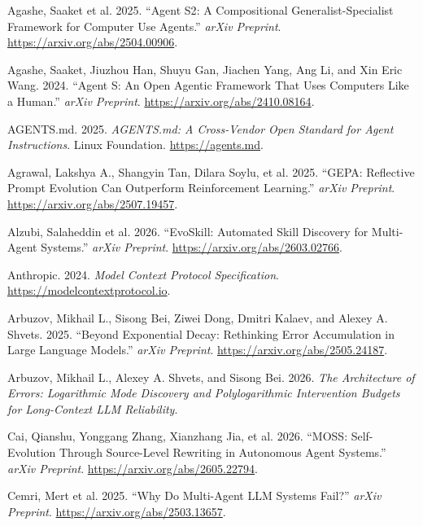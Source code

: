 \documentclass[
]{article}
\newlength{\cslhangindent}
\newenvironment{CSLReferences}[2] %
 {\begin{list}{}{%
  \setlength{\itemindent}{0pt}
  \setlength{\leftmargin}{0pt}
  \setlength{\parsep}{0pt}
  \ifodd #1
   \setlength{\leftmargin}{\cslhangindent}
   \setlength{\itemindent}{-1\cslhangindent}
  \fi
  \setlength{\itemsep}{#2\baselineskip}}}
 {\end{list}}
\begin{document}
\protect{}\label{refs}
\begin{CSLReferences}{1}{1}
{Agashe, Saaket et al.} 2025. {``{Agent S2}: A Compositional
Generalist-Specialist Framework for Computer Use Agents.''} \emph{arXiv
Preprint}. \url{https://arxiv.org/abs/2504.00906}.

Agashe, Saaket, Jiuzhou Han, Shuyu Gan, Jiachen Yang, Ang Li, and Xin
Eric Wang. 2024. {``{Agent S}: An Open Agentic Framework That Uses
Computers Like a Human.''} \emph{arXiv Preprint}.
\url{https://arxiv.org/abs/2410.08164}.

AGENTS.md. 2025. \emph{{AGENTS.md}: A Cross-Vendor Open Standard for
Agent Instructions}. Linux Foundation. \url{https://agents.md}.

Agrawal, Lakshya A., Shangyin Tan, Dilara Soylu, et al. 2025. {``{GEPA}:
Reflective Prompt Evolution Can Outperform Reinforcement Learning.''}
\emph{arXiv Preprint}. \url{https://arxiv.org/abs/2507.19457}.

{Alzubi, Salaheddin et al.} 2026. {``{EvoSkill}: Automated Skill
Discovery for Multi-Agent Systems.''} \emph{arXiv Preprint}.
\url{https://arxiv.org/abs/2603.02766}.

Anthropic. 2024. \emph{Model Context Protocol Specification}.
\url{https://modelcontextprotocol.io}.

Arbuzov, Mikhail L., Sisong Bei, Ziwei Dong, Dmitri Kalaev, and Alexey
A. Shvets. 2025. {``Beyond Exponential Decay: Rethinking Error
Accumulation in Large Language Models.''} \emph{arXiv Preprint}.
\url{https://arxiv.org/abs/2505.24187}.

Arbuzov, Mikhail L., Alexey A. Shvets, and Sisong Bei. 2026. \emph{The
Architecture of Errors: Logarithmic Mode Discovery and Polylogarithmic
Intervention Budgets for Long-Context {LLM} Reliability}.

Cai, Qianshu, Yonggang Zhang, Xianzhang Jia, et al. 2026. {``{MOSS}:
Self-Evolution Through Source-Level Rewriting in Autonomous Agent
Systems.''} \emph{arXiv Preprint}.
\url{https://arxiv.org/abs/2605.22794}.

{Cemri, Mert et al.} 2025. {``Why Do Multi-Agent {LLM} Systems Fail?''}
\emph{arXiv Preprint}. \url{https://arxiv.org/abs/2503.13657}.


\end{CSLReferences}
\end{document}
